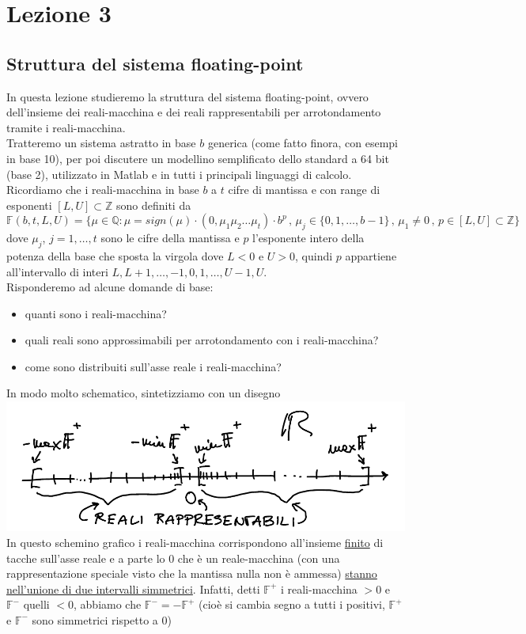 \documentclass[12pt]{article}
\begin{document}
\section*{Lezione 3}
\subsection*{Struttura del sistema floating-point}
In questa lezione studieremo la struttura del sistema floating-point, ovvero dell'insieme dei reali-macchina e dei reali rappresentabili per arrotondamento tramite i reali-macchina.\\
Tratteremo un sistema astratto in base $b$ generica (come fatto finora, con esempi in base 10), per poi discutere un modellino semplificato dello standard a 64 bit (base 2), utilizzato in Matlab e in tutti i principali linguaggi di calcolo.\\
Ricordiamo che i reali-macchina in base $b$ a $t$ cifre di mantissa e con range di esponenti $[L,U] \subset \mathbb{Z}$ sono definiti da
\[ \mathbb{F}(b, t, L, U) = \{ \mu \in \mathbb{Q} : \mu = sign(\mu)\cdot (0,\mu_1 \mu_2 \dotsc \mu_t) \cdot b^p \,,\, \mu_j \in \{ 0, 1, \dotsc, b-1 \} \,,\, \mu_1 \ne 0 \,,\, p \in [L,U] \subset \mathbb{Z} \} \]
dove $\mu_j$, $j = 1, \dotsc, t$ sono le cifre della mantissa e $p$ l'esponente intero della potenza della base che sposta la virgola dove $L<0$ e $U>0$, quindi $p$ appartiene all'intervallo di interi $L, L+1, \dotsc, -1, 0, 1, \dotsc, U-1, U$.\\
Risponderemo ad alcune domande di base:
\begin{itemize}
    \item quanti sono i reali-macchina?
    \item quali reali sono approssimabili per arrotondamento con i reali-macchina?
    \item come sono distribuiti sull'asse reale i reali-macchina?
\end{itemize}
In modo molto schematico, sintetizziamo con un disegno \newline
\includegraphics[width=\linewidth]{img2}
In questo schemino grafico i reali-macchina corrispondono all'insieme \underline{finito} di tacche sull'asse reale e a parte lo 0 che è un reale-macchina (con una rappresentazione speciale visto che la mantissa nulla non è ammessa) \underline{stanno nell'unione di due intervalli simmetrici}. Infatti, detti $\mathbb{F}^+$ i reali-macchina $>0$ e $\mathbb{F}^-$ quelli $<0$, abbiamo che $\mathbb{F}^- = - \mathbb{F}^+$ (cioè si cambia segno a tutti i positivi, $\mathbb{F}^+$ e $\mathbb{F}^-$ sono simmetrici rispetto a 0) 
\end{document}
